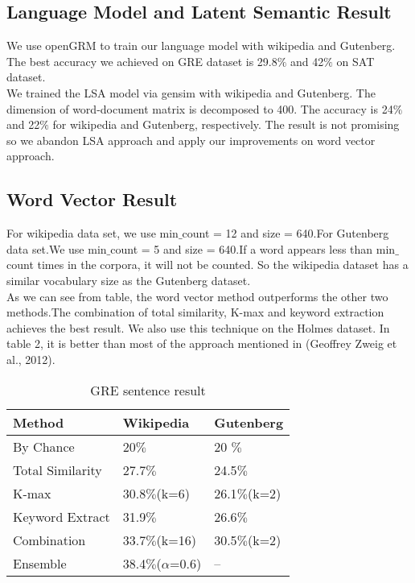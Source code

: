 \documentclass[11pt]{article}
\begin{document}
\subsection{Language Model and Latent Semantic Result}
We use openGRM to train our language model with wikipedia and Gutenberg. The  best accuracy we achieved on GRE dataset is 29.8$\%$ and 42$\%$ on SAT dataset. \\
We trained the LSA model via gensim with wikipedia and Gutenberg. The dimension of word-document matrix is decomposed to 400. The accuracy is 24$\%$ and 22$\%$ for wikipedia and Gutenberg, respectively. The result is not promising so we abandon LSA approach and apply our improvements on word vector approach. 

\subsection{Word Vector Result}
For wikipedia data set, we use min$\_$count = 12 and size = 640.For Gutenberg data set.We use min$\_$count = 5 and size = 640.If a word appears less than min$\_$count times in the corpora, it will not be counted. So the wikipedia dataset has a similar vocabulary size as the Gutenberg dataset.\\
As we can see from table, the word vector method outperforms the other two methods.The combination of total similarity, K-max and keyword extraction achieves the best result. We also use this technique on the Holmes dataset. In table 2, it is better than most of the approach mentioned in (Geoffrey Zweig et al., 2012).
\begin{table}[h]
\begin{center}
\begin{tabular}[bottom]{|l | l | l |}
\hline
\bf Method & \bf Wikipedia & \bf Gutenberg \\ \hline
By Chance & 20$\%$ & 20 $\%$ \\\hline
Total Similarity & 27.7$\%$ & 24.5$\%$ \\\hline
K-max & 30.8$\%$(k=6) & 26.1$\%$(k=2) \\\hline
Keyword Extract& 31.9$\%$ & 26.6$\%$\\\hline
Combination & 33.7$\%$(k=16) & 30.5$\%$(k=2)\\\hline
Ensemble & 38.4$\%$($\alpha$=0.6)  & --\\\hline
\end{tabular}
\end{center}
\caption{\label{font-table} GRE sentence result }
\end{table}
\end{document}
